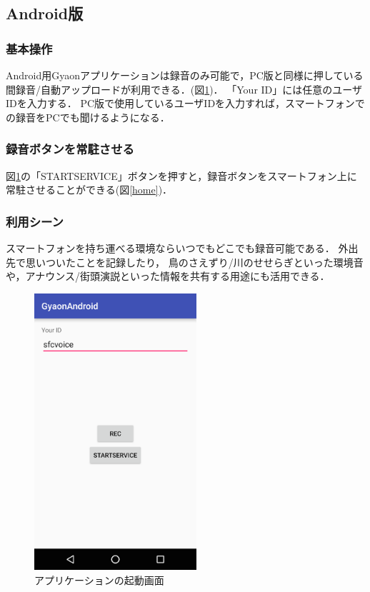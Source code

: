 \subsection{Android版}

\subsubsection{基本操作}
Android用Gyaonアプリケーションは録音のみ可能で，PC版と同様に押している間録音/自動アップロードが利用できる．(図\ref{app})．
「Your ID」には任意のユーザIDを入力する．
PC版で使用しているユーザIDを入力すれば，スマートフォンでの録音をPCでも聞けるようになる．

\subsubsection{録音ボタンを常駐させる}
図\ref{app}の「STARTSERVICE」ボタンを押すと，録音ボタンをスマートフォン上に常駐させることができる(図\ref{home})．

\subsubsection{利用シーン}
スマートフォンを持ち運べる環境ならいつでもどこでも録音可能である．
外出先で思いついたことを記録したり，
鳥のさえずり/川のせせらぎといった環境音や，アナウンス/街頭演説といった情報を共有する用途にも活用できる．

\begin{figure}[H]
\centering
\includegraphics[width=6cm]{images/app.png}
\caption{アプリケーションの起動画面}
\label{app}
\end{figure}

